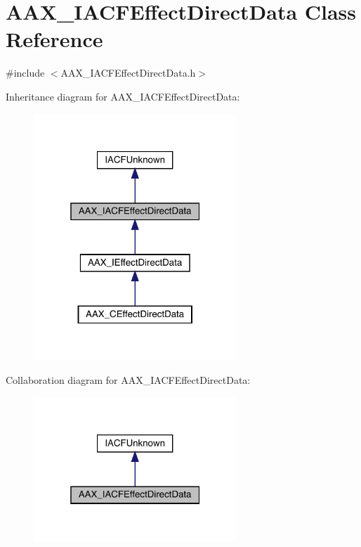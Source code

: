 \hypertarget{a01661}{}\section{A\+A\+X\+\_\+\+I\+A\+C\+F\+Effect\+Direct\+Data Class Reference}
\label{a01661}


{\ttfamily \#include $<$A\+A\+X\+\_\+\+I\+A\+C\+F\+Effect\+Direct\+Data.\+h$>$}



Inheritance diagram for A\+A\+X\+\_\+\+I\+A\+C\+F\+Effect\+Direct\+Data\+:
\nopagebreak
\begin{figure}[H]
\begin{center}
\leavevmode
\includegraphics[width=217pt]{a01660}
\end{center}
\end{figure}


Collaboration diagram for A\+A\+X\+\_\+\+I\+A\+C\+F\+Effect\+Direct\+Data\+:
\nopagebreak
\begin{figure}[H]
\begin{center}
\leavevmode
\includegraphics[width=217pt]{a01659}
\end{center}
\end{figure}



